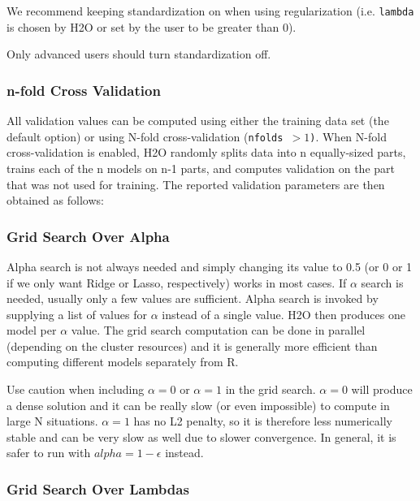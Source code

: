 We recommend keeping standardization on when using regularization (i.e. \texttt{lambda} is chosen by H2O or set by
the user to be greater than 0).

Only advanced users should turn standardization off.

\subsubsection{n-fold Cross Validation}

All validation values can be computed using either the training data set (the default option) or using N-fold
cross-validation (\texttt{nfolds $> 1$)}. When N-fold cross-validation is enabled, H2O randomly splits data into n
equally-sized parts, trains each of the n models on n-1 parts, and computes validation on the part that was not
used for training. The reported validation parameters are then obtained as follows:

\subsubsection{Grid Search Over Alpha}

Alpha search is not always needed and simply changing its value to 0.5 (or 0 or 1 if we only want Ridge or Lasso,
respectively) works in most cases. If $\alpha$ search is needed, usually only a few values are sufficient. Alpha
search is invoked by supplying a list of values for $\alpha$ instead of a single value. H2O then produces one model
per $\alpha$ value. The grid search computation can be done in parallel (depending on the cluster resources) and it
is generally more efficient than computing different models separately from R.

Use caution when including $\alpha=0$ or $\alpha=1$ in the grid search. $\alpha=0$ will produce a dense solution
and it can be really slow (or even impossible) to compute in large N situations. $\alpha=1$ has no L2 penalty, so
it is therefore less numerically stable and can be very slow as well due to slower convergence. In general, it is
safer to run with $alpha=1-\epsilon$ instead.

\bigskip
\waterExampleInR


\subsubsection{Grid Search Over Lambdas}

